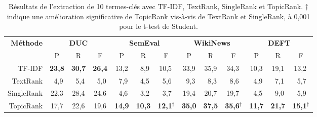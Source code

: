     \begin{table}
      \centering
      \begin{tabular}{@{~}r@{~~}c@{~~}c@{~~}c@{~~}c@{~~}c@{~~}c@{~~}c@{~~}c@{~~}c@{~~}c@{~~}c@{~~}c@{~}}
        \toprule
        \multirow{2}{*}[-2pt]{\textbf{Méthode}} & \multicolumn{3}{c}{\textbf{DUC}} & \multicolumn{3}{c}{\textbf{SemEval}} & \multicolumn{3}{c}{\textbf{WikiNews}} & \multicolumn{3}{c}{\textbf{DEFT}}\\
        \cmidrule(r){2-4}\cmidrule(r){5-7}\cmidrule(r){8-10}\cmidrule{11-13}
        & P & R & F & P & R & F & P & R & F & P & R & F\\
        \midrule
        TF-IDF & \textbf{23,8} & \textbf{30,7} & \textbf{26,4} & 13,2 & $~~$8,9 & 10,5$^{~}$ & 33,9 & 35,9 & 34,3$^{~}$ & 10,3 & 19,1 & 13,2$^{~}$\\
        TextRank & $~~$4,9 & $~~$5,4 & $~~$5,0 & $~~$7,9 & $~~$4,5 & $~~$5,6$^{~}$ & $~~$9,3 & $~~$8,3 & $~~$8,6$^{~}$ & $~~$4,9 & $~~$7,1 & $~~$5,7$^{~}$\\
        SingleRank & 22,3 & 28,4 & 24,6 & $~~$4,6 & $~~$3,2 & $~~$3,7$^{~}$ & 19,4 & 20,7 & 19,7$^{~}$ & $~~$4,5 & $~~$9,0 & $~~$5,9$^{~}$\\
        TopicRank & 17,7 & 22,6 & 19,6 & \textbf{14,9} & \textbf{10,3} & \textbf{12,1}$^\dagger$ & \textbf{35,0} & \textbf{37,5} & \textbf{35,6}$^\dagger$ & \textbf{11,7} & \textbf{21,7} & \textbf{15,1}$^\dagger$\\
        \bottomrule
      \end{tabular}
      \caption{Résultats de l'extraction de 10 termes-clés avec TF-IDF,
               TextRank, SingleRank et TopicRank. $\dagger$ indique une
               amélioration significative de TopicRank vis-à-vis de TextRank et
               SingleRank, à 0,001 pour le t-test de Student.
               \label{tab:resultats_globaux}}
    \end{table}

